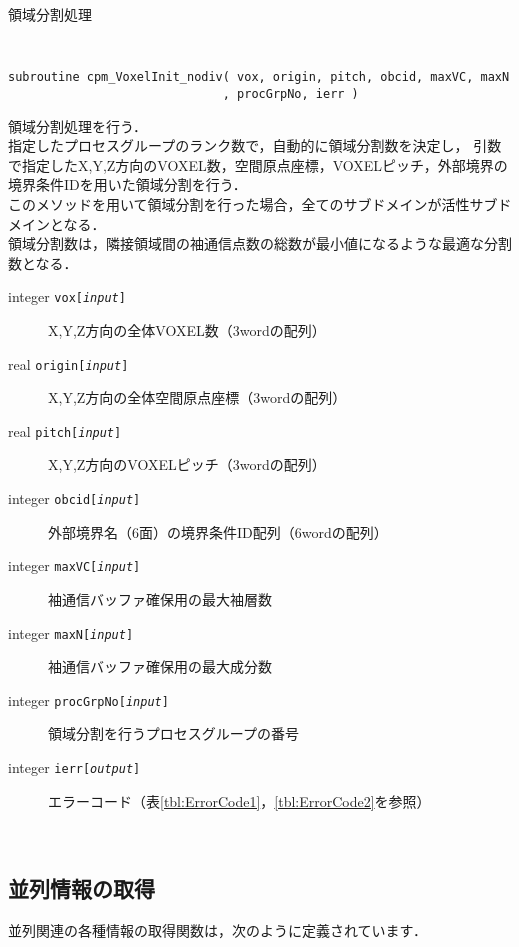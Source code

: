 \begin{spacing}{0.8}
\begin{itembox}[l]{領域分割処理}
{\tt
\begin{verbatim}
subroutine cpm_VoxelInit_nodiv( vox, origin, pitch, obcid, maxVC, maxN
                              , procGrpNo, ierr )
\end{verbatim}
}
領域分割処理を行う．\\
指定したプロセスグループのランク数で，自動的に領域分割数を決定し，
引数で指定したX,Y,Z方向のVOXEL数，空間原点座標，VOXELピッチ，外部境界の
境界条件IDを用いた領域分割を行う．\\
このメソッドを用いて領域分割を行った場合，全てのサブドメインが活性サブドメインとなる．\\
領域分割数は，隣接領域間の袖通信点数の総数が最小値になるような最適な分割数となる．
\begin{description}
\item[integer {\tt vox[{\it input}]}] X,Y,Z方向の全体VOXEL数（3wordの配列）
\item[real    {\tt origin[{\it input}]}] X,Y,Z方向の全体空間原点座標（3wordの配列）
\item[real    {\tt pitch[{\it input}]}] X,Y,Z方向のVOXELピッチ（3wordの配列）
\item[integer {\tt obcid[{\it input}]}] 外部境界名（6面）の境界条件ID配列（6wordの配列）
\item[integer {\tt maxVC[{\it input}]}] 袖通信バッファ確保用の最大袖層数
\item[integer {\tt maxN[{\it input}]}] 袖通信バッファ確保用の最大成分数
\item[integer {\tt procGrpNo[{\it input}]}] 領域分割を行うプロセスグループの番号
\item[integer {\tt ierr[{\it output}]}] エラーコード（表\ref{tbl:ErrorCode1}，\ref{tbl:ErrorCode2}を参照）
\end{description}
\end{itembox}\\
\end{spacing}


\clearpage


\subsection{並列情報の取得}
\label{paraInfoF}
並列関連の各種情報の取得関数は，次のように定義されています．\\

